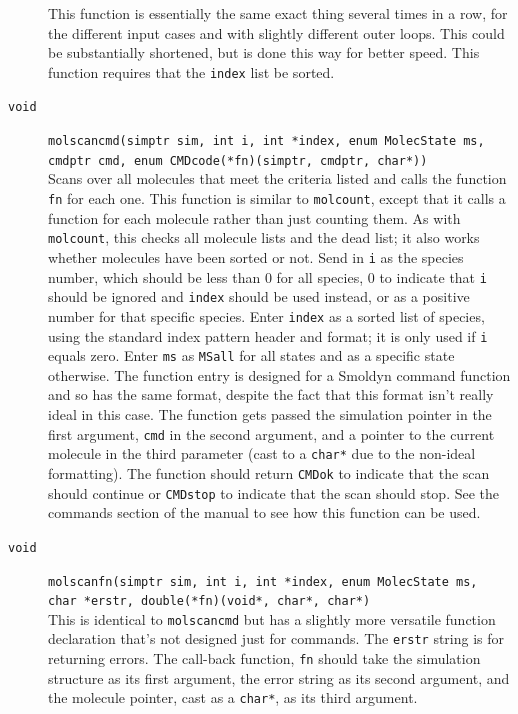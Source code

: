 \documentclass {scrbook}
\newcommand {\ttt} {\texttt}
\begin{document}
\begin{description}
This function is essentially the same exact thing several times in a row, for the different input cases and with slightly different outer loops. This could be substantially shortened, but is done this way for better speed. This function requires that the \ttt{index} list be sorted.

\item[\ttt{void}]
\ttt{molscancmd(simptr sim, int i, int *index, enum MolecState ms, cmdptr cmd, enum CMDcode(*fn)(simptr, cmdptr, char*))}
\hfill \\
Scans over all molecules that meet the criteria listed and calls the function \ttt{fn} for each one. This function is similar to \ttt{molcount}, except that it calls a function for each molecule rather than just counting them. As with \ttt{molcount}, this checks all molecule lists and the dead list; it also works whether molecules have been sorted or not. Send in \ttt{i} as the species number, which should be less than 0 for all species, 0 to indicate that \ttt{i} should be ignored and \ttt{index} should be used instead, or as a positive number for that specific species. Enter \ttt{index} as a sorted list of species, using the standard index pattern header and format; it is only used if \ttt{i} equals zero. Enter \ttt{ms} as \ttt{MSall} for all states and as a specific state otherwise. The function entry is designed for a Smoldyn command function and so has the same format, despite the fact that this format isn't really ideal in this case. The function gets passed the simulation pointer in the first argument, \ttt{cmd} in the second argument, and a pointer to the current molecule in the third parameter (cast to a \ttt{char*} due to the non-ideal formatting). The function should return \ttt{CMDok} to indicate that the scan should continue or \ttt{CMDstop} to indicate that the scan should stop. See the commands section of the manual to see how this function can be used.

\item[\ttt{void}]
\ttt{molscanfn(simptr sim, int i, int *index, enum MolecState ms, char *erstr, double(*fn)(void*, char*, char*)}
\hfill \\
This is identical to \ttt{molscancmd} but has a slightly more versatile function declaration that's not designed just for commands. The \ttt{erstr} string is for returning errors. The call-back function, \ttt{fn} should take the simulation structure as its first argument, the error string as its second argument, and the molecule pointer, cast as a \ttt{char*}, as its third argument.


\end{description}
\end{document}
